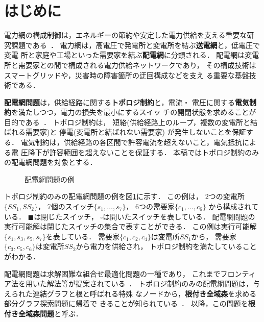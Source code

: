 ﻿\section{はじめに}\label{chap:intro}

電力網の構成制御は，エネルギーの節約や安定した電力供給を支える重要な研
究課題である~\cite{BarWu89,ChiJum90}．
電力網は，高電圧で発電所と変電所を結ぶ\textbf{送電網}と，低電圧で変電
所と家庭や工場といった需要家を結ぶ\textbf{配電網}に分類される．
配電網は変電所と需要家との間で構成される電力供給ネットワークであり，
その構成技術はスマートグリッドや，災害時の障害箇所の迂回構成などを支え
る重要な基盤技術である．

\textbf{配電網問題}は，供給経路に関する\textbf{トポロジ制約}と，電流・
電圧に関する\textbf{電気制約}を満たしつつ，電力の損失を最小にするスイッ
チの開閉状態を求めることが目的である~\cite{Hayashi:dnet:model}．
トポロジ制約は，
短絡(供給経路上のループ，複数の変電所と結ばれる需要家)と
停電(変電所と結ばれない需要家)
が発生しないことを保証する．
電気制約は，供給経路の各区間で許容電流を超えないこと，電気抵抗による電
圧降下が許容範囲を超えないことを保証する．
本稿ではトポロジ制約のみの配電網問題を対象とする．

\begin{figure}[htbp]
  \centering
  \scalebox{0.7}{}
  \caption{配電網問題の例}
  \label{fig:dnetgraph}
\end{figure}



トポロジ制約のみの配電網問題の例を図\ref{fig:dnetgraph}に示す．
この例は，
2つの変電所$\{SS_{1}, SS_{2}\}$，
7個のスイッチ$\{s_{1},\ldots, s_{7}\}$，
6つの需要家$\{c_{1},\ldots, c_{6}\}$
から構成されている．
$\blacksquare$は閉じたスイッチ，
$\square$は開いたスイッチを表している．
配電網問題の実行可能解は閉じたスイッチの集合で表すことができる．
この例は実行可能解$\{s_{1},s_{3},s_{5},s_{7}\}$を表している．
需要家$\{c_{1},c_{2},c_{4}\}$は変電所$SS_{1}$から，
需要家$\{c_{3},c_{5},c_{6}\}$は変電所$SS_{2}$から電力を供給され，
トポロジ制約を満たしていることがわかる．

配電網問題は求解困難な組合せ最適化問題の一種であり，
これまでフロンティア法を用いた解法等が提案されている~\cite{Minato:dnet:ZDD}．
トポロジ制約のみの配電網問題は，与えられた連結グラフと根と呼ばれる特殊
なノードから，\textbf{根付き全域森}を求める部分グラフ探索問題に帰着で
きることが知られている~\cite{Minato:dnet:netuki}．
以降，この問題を\textbf{根付き全域森問題}と呼ぶ．


